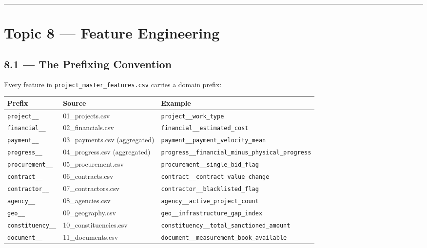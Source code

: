 \documentclass[11pt,a4paper]{article}
\begin{document}
\vspace{1em}\hrule\vspace{1em}

\section{Topic 8 --- Feature Engineering}

\subsection{8.1 --- The Prefixing Convention}

Every feature in \texttt{project\_master\_features.csv} carries a domain prefix:

\begin{table}[htbp]
\centering
\small
\begin{tabularx}{\textwidth}{l l Y}
\toprule
\textbf{Prefix} & \textbf{Source} & \textbf{Example} \\
\midrule
\texttt{project\_\_} & 01\_projects.csv & \texttt{project\_\_work\_type} \\
\texttt{financial\_\_} & 02\_financials.csv & \texttt{financial\_\_estimated\_cost} \\
\texttt{payment\_\_} & 03\_payments.csv (aggregated) & \texttt{payment\_\_payment\_velocity\_mean} \\
\texttt{progress\_\_} & 04\_progress.csv (aggregated) & \texttt{progress\_\_financial\_minus\_physical\_progress} \\
\texttt{procurement\_\_} & 05\_procurement.csv & \texttt{procurement\_\_single\_bid\_flag} \\
\texttt{contract\_\_} & 06\_contracts.csv & \texttt{contract\_\_contract\_value\_change} \\
\texttt{contractor\_\_} & 07\_contractors.csv & \texttt{contractor\_\_blacklisted\_flag} \\
\texttt{agency\_\_} & 08\_agencies.csv & \texttt{agency\_\_active\_project\_count} \\
\texttt{geo\_\_} & 09\_geography.csv & \texttt{geo\_\_infrastructure\_gap\_index} \\
\texttt{constituency\_\_} & 10\_constituencies.csv & \texttt{constituency\_\_total\_sanctioned\_amount} \\
\texttt{document\_\_} & 11\_documents.csv & \texttt{document\_\_measurement\_book\_available} \\
\bottomrule
\end{tabularx}
\end{table}
\end{document}
